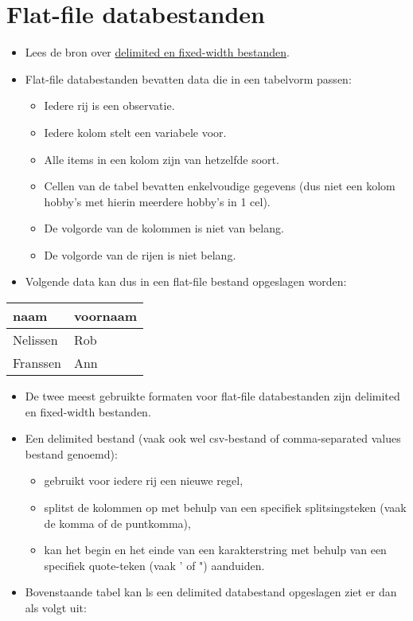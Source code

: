 \documentclass[]{memoir}
\providecommand{\tightlist}{%
  \setlength{\itemsep}{0pt}\setlength{\parskip}{0pt}}
\begin{document}
\hypertarget{flat-file-databestanden-1}{%
\section{Flat-file databestanden}\label{flat-file-databestanden-1}}

\begin{itemize}
\tightlist
\item
  Lees de bron over \href{https://www.techwalla.com/articles/what-is-a-delimited-a-fixed-width-file}{delimited en fixed-width bestanden}.
\item
  Flat-file databestanden bevatten data die in een tabelvorm passen:

  \begin{itemize}
  \tightlist
  \item
    Iedere rij is een observatie.
  \item
    Iedere kolom stelt een variabele voor.
  \item
    Alle items in een kolom zijn van hetzelfde soort.
  \item
    Cellen van de tabel bevatten enkelvoudige gegevens (dus niet een kolom hobby's met hierin meerdere hobby's in 1 cel).
  \item
    De volgorde van de kolommen is niet van belang.
  \item
    De volgorde van de rijen is niet belang.
  \end{itemize}
\item
  Volgende data kan dus in een flat-file bestand opgeslagen worden:
\end{itemize}

\begin{longtable}[]{@{}ll@{}}
\toprule
naam & voornaam\tabularnewline
\midrule
\endhead
Nelissen & Rob\tabularnewline
Franssen & Ann\tabularnewline
\bottomrule
\end{longtable}

\begin{itemize}
\tightlist
\item
  De twee meest gebruikte formaten voor flat-file databestanden zijn delimited en fixed-width bestanden.
\item
  Een delimited bestand (vaak ook wel csv-bestand of comma-separated values bestand genoemd):

  \begin{itemize}
  \tightlist
  \item
    gebruikt voor iedere rij een nieuwe regel,
  \item
    splitst de kolommen op met behulp van een specifiek splitsingsteken (vaak de komma of de puntkomma),
  \item
    kan het begin en het einde van een karakterstring met behulp van een specifiek quote-teken (vaak ' of ") aanduiden.
  \end{itemize}
\item
  Bovenstaande tabel kan ls een delimited databestand opgeslagen ziet er dan als volgt uit:
\end{itemize}
\end{document}
